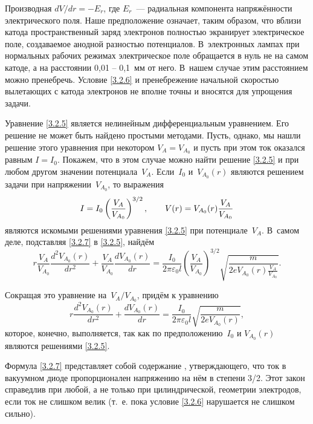 Производная $dV/dr=-E_r$, где $E_r$~--- радиальная компонента напряжённости
электрического поля. Наше предположение
означает, таким образом, что вблизи катода пространственный заряд электронов
полностью экранирует электрическое поле, создаваемое анодной разностью
потенциалов. В~электронных лампах при нормальных рабочих режимах электрическое
поле обращается в нуль не на самом катоде, а на расстоянии 0,01 -- 0,1~мм от
него. В~нашем случае этим расстоянием можно пренебречь. Условие \eqref{3.2.6} и
пренебрежение начальной скоростью вылетающих с катода электронов не вполне точны
и вносятся для упрощения задачи.

Уравнение \eqref{3.2.5} является нелинейным дифференциальным уравнением. Его
решение не может быть найдено простыми методами. Пусть, однако, мы нашли решение
этого уравнения при некотором $V_A=V_{A_0}$ и пусть при этом ток оказался равным
$I=I_0$. Покажем, что в этом случае можно найти решение \eqref{3.2.5} и при
любом другом значении потенциала~$V_A$. Если~$I_0$ и~$V_{A_0}(r)$ являются
решением задачи при напряжении~$V_{A_0}$, то выражения
\begin{equation}
	I=I_0\left(\frac{V_A}{V_{A_0}}\right)^{3/2},\qquad
V(r)=V_{A_0}(r)\frac{V_A}{V_{A_0}}
	\eqmark{3.2.7}
\end{equation}
являются искомыми решениями уравнения \eqref{3.2.5} при потенциале~$V_A$.
В~самом деле, подставляя \eqref{3.2.7} в \eqref{3.2.5}, найдём
\begin{equation*}
	r\frac{V_A}{V_{A_0}} \frac{d^2V_{A_0}(r)}{dr^2}+\frac{V_A}{V_{A_0}}
\frac{dV_{A_0}(r)}{dr}=
\frac{I_0}{2\pi\varepsilon_0l} \left( \frac{V_A}{V_{A_0}} \right)^{3/2} \sqrt{
\frac{m}{2eV_{A_0}(r )\frac{V_A}{V_{A_0}}}}.
\end{equation*}

Сокращая это уравнение на~$V_A/V_{A_0}$, придём к уравнению
\begin{equation*}
	r\frac{d^2V_{A_0}(r)}{dr^2}+
\frac{dV_{A_0}(r)}{dr}=\frac{I_0}{2\pi\varepsilon_0l}\sqrt{\frac{m}{2eV_{A_0}(r)
}},
\end{equation*}
которое, конечно, выполняется, так как по предположению~$I_0$ и $V_{A_0}(r)$
являются решениями \eqref{3.2.5}.

Формула \eqref{3.2.7} представляет собой содержание , утверждающего, что ток в вакуумном диоде пропорционален напряжению на
нём в степени 3/2. Этот закон справедлив при любой, а не только при
цилиндрической, геометрии электродов, если ток не слишком велик (т.~е. пока
условие \eqref{3.2.6} нарушается не слишком сильно).

